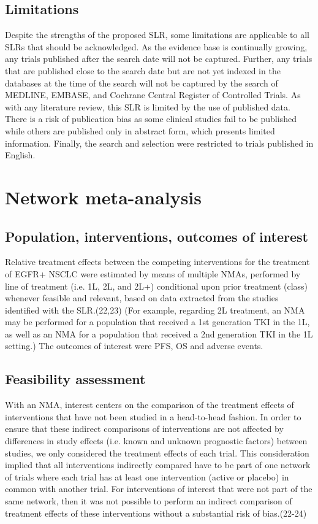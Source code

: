 \documentclass[11pt,final,fleqn]{article}\usepackage[]{graphicx}\usepackage[]{color}
\theoremstyle{plain}
\begin{document}
{\begin{appendices}
\subsection{Limitations}

Despite the strengths of the proposed SLR, some limitations are applicable to all SLRs that should be acknowledged. As the evidence base is continually growing, any trials published after the search date will not be captured. Further, any trials that are published close to the search date but are not yet indexed in the databases at the time of the search will not be captured by the search of MEDLINE, EMBASE, and Cochrane Central Register of Controlled Trials. As with any literature review, this SLR is limited by the use of published data. There is a risk of publication bias as some clinical studies fail to be published while others are published only in abstract form, which presents limited information. Finally, the search and selection were restricted to trials published in English.

\section{Network meta-analysis}

\subsection{Population, interventions, outcomes of interest}

Relative treatment effects between the competing interventions for the treatment of EGFR+ NSCLC were estimated by means of multiple NMAs, performed by line of treatment (i.e. 1L, 2L, and 2L+) conditional upon prior treatment (class) whenever feasible and relevant, based on data extracted from the studies identified with the SLR.(22,23) (For example, regarding 2L treatment, an NMA may be performed for a population that received a 1st generation TKI in the 1L, as well as an NMA for a population that received a 2nd generation TKI in the 1L setting.) The outcomes of interest were PFS, OS and adverse events. 

\subsection{Feasibility assessment}

With an NMA, interest centers on the comparison of the treatment effects of interventions that have not been studied in a head-to-head fashion. In order to ensure that these indirect comparisons of interventions are not affected by differences in study effects (i.e. known and unknown prognostic factors) between studies, we only considered the treatment effects of each trial. This consideration implied that all interventions indirectly compared have to be part of one network of trials where each trial has at least one intervention (active or placebo) in common with another trial. For interventions of interest that were not part of the same network, then it was not possible to perform an indirect comparison of treatment effects of these interventions without a substantial risk of bias.(22-24)


\end{appendices}}
\end{document}
